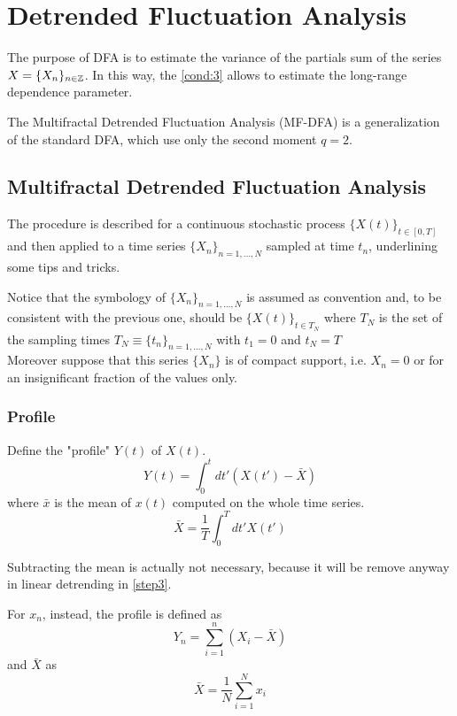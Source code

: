 \section{Detrended Fluctuation Analysis}


The purpose of DFA is to estimate the variance of the partials sum of the series $X = \{ X_n \}_{n \in \mathbb{Z}}$. In this way, the \autoref{cond:3} allows to estimate the long-range dependence parameter. 

The Multifractal Detrended Fluctuation Analysis (MF-DFA) is a generalization of the standard DFA, which use only the second moment $q = 2$. 

\subsection{Multifractal Detrended Fluctuation Analysis}
The procedure is described for a continuous stochastic process $\{X(t)\}_{t\in [0, T]}$ and then applied to a time series $\{ X_n \}_{n = 1, \dots, N} $ sampled at time $t_n$, underlining some tips and tricks. 

Notice that the symbology of $\{ X_n \}_{n = 1, \dots, N} $ is assumed as convention and, to be consistent with the previous one, should be
$\{ X(t) \}_{t \in T_N}$ where $T_N$ is the set of the sampling times $T_N \equiv \{ t_n\}_{n = 1, \dots, N}$ with $t_1 = 0$ and $t_N = T$ \\
Moreover suppose that this series $\{ X_n \}$ is of compact support, i.e. $X_n = 0$ or for an insignificant fraction of the values only. 

\subsubsection{Profile}\label{step1}
Define the "profile" $Y(t)$ of $X(t)$.
\begin{equation}
	Y( t ) = \int_{0}^{t} dt' (X( t' ) - \bar{X} ) 
\end{equation}
where $\bar{x}$ is the mean of $x(t)$ computed on the whole time series.
\begin{equation}
	\bar{X} = \frac{1}{T} \int_{0}^{T} dt' X( t' )
\end{equation}

Subtracting the mean is actually not necessary, because it will be remove anyway in linear detrending in \autoref{step3}.

For $x_n$, instead, the profile is defined as 
\begin{equation}
	Y_n = \sum_{i=1}^{n} \left( X_i - \bar{X} \right)
\end{equation}
and $\bar{X}$ as 
\begin{equation}
	\bar{X} = \frac{1}{N} \sum_{i=1}^{N} x_i 
\end{equation}

